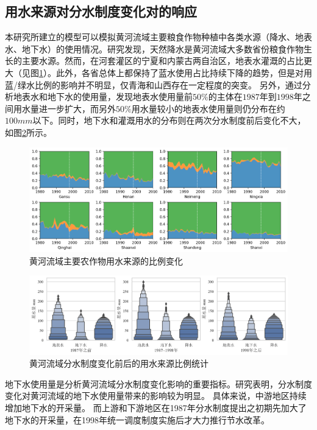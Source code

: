 \subsection{用水来源对分水制度变化对的响应}

本研究所建立的模型可以模拟黄河流域主要粮食作物种植中各类水源（降水、地表水、地下水）的使用情况。研究发现，天然降水是黄河流域大多数省份粮食作物生长的主要水源。然而，在河套灌区的宁夏和内蒙古两自治区，地表水灌溉的占比更大（见图\ref{ch6:fig:sources}）。此外，各省总体上都保持了蓝水使用占比持续下降的趋势，但是对用蓝/绿水比例的影响并不明显，仅青海和山西存在一定程度的突变。
另外，通过分析地表水和地下水的使用量，发现地表水使用量前$50\%$的主体在$1987$年到$1998$年之间用水量进一步扩大，而另外$50\%$用水量较小的地表水使用量则仍分布在约$100mm$以下。同时，地下水和灌溉用水的分布则在两次分水制度前后变化不大，如图\ref{ch6:fig:sources_change}所示。


\begin{figure}[htb]
    \centering
    \includegraphics[width=\textwidth]{img/ch6/ch6_green_blue_water.png}
    \caption{黄河流域主要农作物用水来源的比例变化}\label{ch6:fig:sources}
\end{figure}

\begin{figure}[htb]
    \centering
    \includegraphics[width=\textwidth]{img/ch6/ch6_sources_change.png}
    \caption{黄河流域分水制度变化前后的用水来源比例统计}\label{ch6:fig:sources_change}
\end{figure}

地下水使用量是分析黄河流域分水制度变化影响的重要指标。研究表明，分水制度变化对黄河流域的地下水使用量带来的影响较为明显。
具体来说，中游地区持续增加地下水的开采量。
而上游和下游地区在1987年分水制度提出之初期先加大了地下水的开采量，在1998年统一调度制度实施后才大力推行节水改革。

